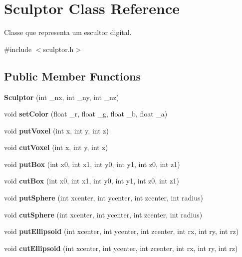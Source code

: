 \hypertarget{classSculptor}{}\section{Sculptor Class Reference}
\label{classSculptor}


Classe que representa um escultor digital.  




{\ttfamily \#include $<$sculptor.\+h$>$}

\subsection*{Public Member Functions}
\begin{DoxyCompactItemize}
\item 
\mbox{\label{classSculptor_a014e3ef5517bf0e9d9e14486b6ac6433}} 
{\bfseries Sculptor} (int \+\_\+nx, int \+\_\+ny, int \+\_\+nz)
\item 
\mbox{\label{classSculptor_a5723e671e073ac310b6f385a7fdc9f9f}} 
void {\bfseries set\+Color} (float \+\_\+r, float \+\_\+g, float \+\_\+b, float \+\_\+a)
\item 
\mbox{\label{classSculptor_a4bdea3048b419d58e93074060eaa7b52}} 
void {\bfseries put\+Voxel} (int x, int y, int z)
\item 
\mbox{\label{classSculptor_ad9d714a35fc8ae16d06eb5df37c3493c}} 
void {\bfseries cut\+Voxel} (int x, int y, int z)
\item 
\mbox{\label{classSculptor_a311ad7a0fb83fc67ac1f378be8e99fe1}} 
void {\bfseries put\+Box} (int x0, int x1, int y0, int y1, int z0, int z1)
\item 
\mbox{\label{classSculptor_aa84a1b12b09e9e103fc8d78f8d1bc00f}} 
void {\bfseries cut\+Box} (int x0, int x1, int y0, int y1, int z0, int z1)
\item 
\mbox{\label{classSculptor_a794a2b6ee8fc8098fd6150cb46101fc6}} 
void {\bfseries put\+Sphere} (int xcenter, int ycenter, int zcenter, int radius)
\item 
\mbox{\label{classSculptor_a67ab8c0ba5116adb8af1d01ad373ac15}} 
void {\bfseries cut\+Sphere} (int xcenter, int ycenter, int zcenter, int radius)
\item 
\mbox{\label{classSculptor_a093615b0c2b9b3a17a56300b9b939f39}} 
void {\bfseries put\+Ellipsoid} (int xcenter, int ycenter, int zcenter, int rx, int ry, int rz)
\item 
\mbox{\label{classSculptor_a18d2922c111c4c13653ee07d878151ad}} 
void {\bfseries cut\+Ellipsoid} (int xcenter, int ycenter, int zcenter, int rx, int ry, int rz)
\end{DoxyCompactItemize}
